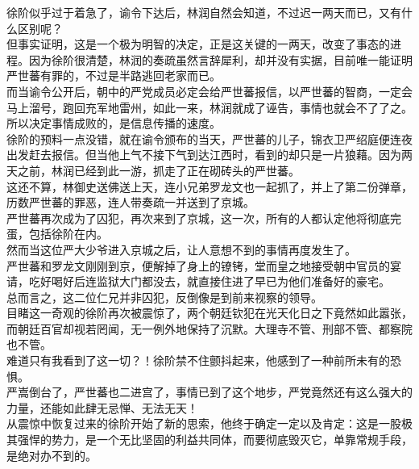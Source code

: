 \begin{multicols}{\theparacolNo}
徐阶似乎过于着急了，谕令下达后，林润自然会知道，不过迟一两天而已，又有什么区别呢？\\

但事实证明，这是一个极为明智的决定，正是这关键的一两天，改变了事态的进程。因为徐阶很清楚，林润的奏疏虽然言辞犀利，却并没有实据，目前唯一能证明严世蕃有罪的，不过是半路逃回老家而已。\\

而当谕令公开后，朝中的严党成员必定会给严世蕃报信，以严世蕃的智商，一定会马上溜号，跑回充军地雷州，如此一来，林润就成了诬告，事情也就会不了了之。\\

所以决定事情成败的，是信息传播的速度。\\

徐阶的预料一点没错，就在谕令颁布的当天，严世蕃的儿子，锦衣卫严绍庭便连夜出发赶去报信。但当他上气不接下气到达江西时，看到的却只是一片狼藉。因为两天之前，林润已经到此一游，抓走了正在砌砖头的严世蕃。\\

这还不算，林御史送佛送上天，连小兄弟罗龙文也一起抓了，并上了第二份弹章，历数严世蕃的罪恶，连人带奏疏一并送到了京城。\\

严世蕃再次成为了囚犯，再次来到了京城，这一次，所有的人都认定他将彻底完蛋，包括徐阶在内。\\

然而当这位严大少爷进入京城之后，让人意想不到的事情再度发生了。\\

严世蕃和罗龙文刚刚到京，便解掉了身上的镣铐，堂而皇之地接受朝中官员的宴请，吃好喝好后连监狱大门都没去，就直接住进了早已为他们准备好的豪宅。\\

总而言之，这二位仁兄并非囚犯，反倒像是到前来视察的领导。\\

目睹这一奇观的徐阶再次被震惊了，两个朝廷钦犯在光天化日之下竟然如此嚣张，而朝廷百官却视若罔闻，无一例外地保持了沉默。大理寺不管、刑部不管、都察院也不管。\\

难道只有我看到了这一切？！徐阶禁不住颤抖起来，他感到了一种前所未有的恐惧。\\

严嵩倒台了，严世蕃也二进宫了，事情已到了这个地步，严党竟然还有这么强大的力量，还能如此肆无忌惮、无法无天！\\

从震惊中恢复过来的徐阶开始了新的思索，他终于确定一定以及肯定：这是一股极其强悍的势力，是一个无比坚固的利益共同体，而要彻底毁灭它，单靠常规手段，是绝对办不到的。\\


\end{multicols}
